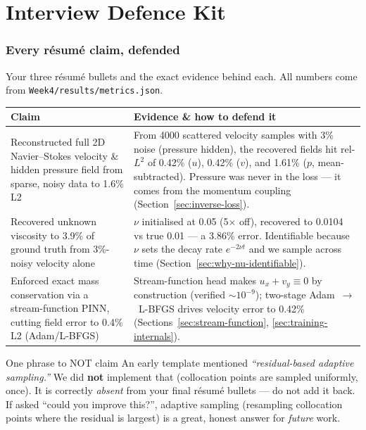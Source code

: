 \documentclass[11pt,a4paper]{article}
\begin{document}
\part{Interview Defence Kit}
\label{part:defence}

\section{Every r\'esum\'e claim, defended}
\label{sec:claims-defended}

Your three r\'esum\'e bullets and the exact evidence behind each. All numbers
come from \texttt{Week4/results/metrics.json}.

\begin{longtable}{@{}p{} p{}@{}}
\toprule
\textbf{Claim} & \textbf{Evidence \& how to defend it} \\
\midrule
\endhead
Reconstructed full 2D Navier--Stokes velocity \& hidden pressure field from
sparse, noisy data to 1.6\% L2 &
From 4000 scattered velocity samples with 3\% noise (pressure hidden), the
recovered fields hit rel-$L^2$ of 0.42\% ($u$), 0.42\% ($v$), and 1.61\% ($p$,
mean-subtracted). Pressure was never in the loss --- it comes from the momentum
coupling (Section~\ref{sec:inverse-loss}). \\[4pt]
Recovered unknown viscosity to 3.9\% of ground truth from 3\%-noisy velocity
alone &
$\nu$ initialised at 0.05 (5$\times$ off), recovered to 0.0104 vs true 0.01 ---
a 3.86\% error. Identifiable because $\nu$ sets the decay rate $e^{-2\nu t}$ and
we sample across time (Section~\ref{sec:why-nu-identifiable}). \\[4pt]
Enforced exact mass conservation via a stream-function PINN, cutting field error
to 0.4\% L2 (Adam/L-BFGS) &
Stream-function head makes $u_x+v_y\equiv 0$ by construction (verified
$\sim 10^{-9}$); two-stage Adam~$\to$~L-BFGS drives velocity error to 0.42\%
(Sections~\ref{sec:stream-function}, \ref{sec:training-internals}). \\
\bottomrule
\end{longtable}

\begin{pitfallbox}{One phrase to NOT claim}
An early template mentioned \emph{``residual-based adaptive sampling.''} We did
\textbf{not} implement that (collocation points are sampled uniformly, once). It
is correctly \emph{absent} from your final r\'esum\'e bullets --- do not add it
back. If asked ``could you improve this?'', adaptive sampling (resampling
collocation points where the residual is largest) is a great, honest answer for
\emph{future} work.
\end{pitfallbox}
\end{document}

